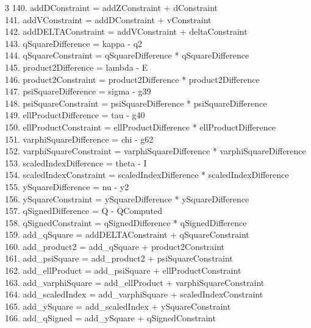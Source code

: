 \documentclass[10pt]{article}
\begin{document}
\begin{multicols}{3}
140. addDConstraint = addZConstraint + dConstraint\\
141. addVConstraint = addDConstraint + vConstraint\\
142. addDELTAConstraint = addVConstraint + deltaConstraint\\
143. qSquareDifference = kappa - q2\\
144. qSquareConstraint = qSquareDifference * qSquareDifference\\
145. product2Difference = lambda - E\\
146. product2Constraint = product2Difference * product2Difference\\
147. psiSquareDifference = sigma - g39\\
148. psiSquareConstraint = psiSquareDifference * psiSquareDifference\\
149. ellProductDifference = tau - g40\\
150. ellProductConstraint = ellProductDifference * ellProductDifference\\
151. varphiSquareDifference = chi - g62\\
152. varphiSquareConstraint = varphiSquareDifference * varphiSquareDifference\\
153. scaledIndexDifference = theta - I\\
154. scaledIndexConstraint = scaledIndexDifference * scaledIndexDifference\\
155. ySquareDifference = nu - y2\\
156. ySquareConstraint = ySquareDifference * ySquareDifference\\
157. qSignedDifference = Q - QComputed\\
158. qSignedConstraint = qSignedDifference * qSignedDifference\\
159. add\_qSquare = addDELTAConstraint + qSquareConstraint\\
160. add\_product2 = add\_qSquare + product2Constraint\\
161. add\_psiSquare = add\_product2 + psiSquareConstraint\\
162. add\_ellProduct = add\_psiSquare + ellProductConstraint\\
163. add\_varphiSquare = add\_ellProduct + varphiSquareConstraint\\
164. add\_scaledIndex = add\_varphiSquare + scaledIndexConstraint\\
165. add\_ySquare = add\_scaledIndex + ySquareConstraint\\
166. add\_qSigned = add\_ySquare + qSignedConstraint\\

\end{multicols}
\end{document}
